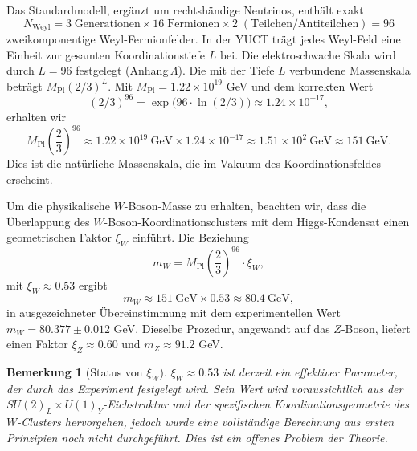 \documentclass[12pt,a4paper]{article}
\newtheorem{remark}{Bemerkung}
\begin{document}
	Das Standardmodell, ergänzt um rechtshändige Neutrinos, enthält exakt
	\begin{equation}
		N_{\mathrm{Weyl}} = 3\;\text{Generationen} \times 16\;\text{Fermionen} \times 2\;(\text{Teilchen/Antiteilchen}) = 96
	\end{equation}
	zweikomponentige Weyl-Fermionfelder.  In der YUCT trägt jedes Weyl-Feld eine Einheit zur gesamten Koordinationstiefe \(L\) bei.  Die elektroschwache Skala wird durch \(L = 96\) festgelegt (Anhang \(\Lambda\)).  Die mit der Tiefe \(L\) verbundene Massenskala beträgt \(M_{\mathrm{Pl}} (2/3)^{L}\).  Mit \(M_{\mathrm{Pl}} = 1.22 \times 10^{19}\) GeV und dem korrekten Wert
	\begin{equation}
		(2/3)^{96} = \exp\bigl(96 \cdot \ln(2/3)\bigr) \approx 1.24 \times 10^{-17},
	\end{equation}
	erhalten wir
	\begin{equation}
		M_{\mathrm{Pl}} \left(\frac{2}{3}\right)^{96} \approx 1.22 \times 10^{19}\ \mathrm{GeV} \times 1.24 \times 10^{-17} \approx 1.51 \times 10^{2}\ \mathrm{GeV} \approx 151\ \mathrm{GeV}.
	\end{equation}
	Dies ist die natürliche Massenskala, die im Vakuum des Koordinationsfeldes erscheint.
	
	Um die physikalische \(W\)-Boson-Masse zu erhalten, beachten wir, dass die Überlappung des \(W\)-Boson-Koordinationsclusters mit dem Higgs-Kondensat einen geometrischen Faktor \(\xi_W\) einführt.  Die Beziehung
	\begin{equation}
		m_W = M_{\mathrm{Pl}} \left(\frac{2}{3}\right)^{96} \cdot \xi_W,
		\label{eq:mw}
	\end{equation}
	mit \(\xi_W \approx 0.53\) ergibt
	\begin{equation}
		m_W \approx 151\ \mathrm{GeV} \times 0.53 \approx 80.4\ \mathrm{GeV},
	\end{equation}
	in ausgezeichneter Übereinstimmung mit dem experimentellen Wert \(m_W = 80.377 \pm 0.012\) GeV.  Dieselbe Prozedur, angewandt auf das \(Z\)-Boson, liefert einen Faktor \(\xi_Z \approx 0.60\) und \(m_Z \approx 91.2\) GeV.
	
	\begin{remark}[Status von \(\xi_W\)]
		\(\xi_W \approx 0.53\) ist derzeit ein effektiver Parameter, der durch das Experiment festgelegt wird.  Sein Wert wird voraussichtlich aus der \(SU(2)_L \times U(1)_Y\)-Eichstruktur und der spezifischen Koordinationsgeometrie des \(W\)-Clusters hervorgehen, jedoch wurde eine vollständige Berechnung aus ersten Prinzipien noch nicht durchgeführt.  Dies ist ein offenes Problem der Theorie.
	\end{remark}
	
\end{document}
